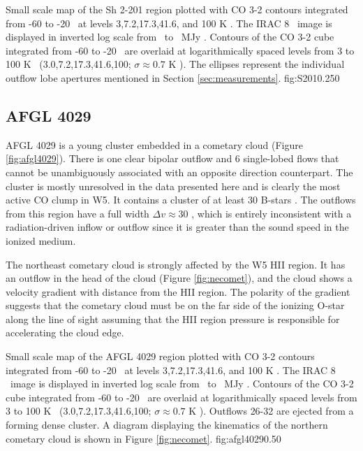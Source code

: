 {Small scale map of the Sh 2-201 region plotted with CO 3-2 contours integrated
from -60 to -20 \kms\ at levels 3,7.2,17.3,41.6, and 100 K \kms.  
The IRAC 8 \um\ image is displayed in inverted log scale from \lowirac\
to \highirac\ MJy \persr. Contours of the CO 3-2 cube integrated from
-60 to -20 \kms\ are overlaid at logarithmically spaced levels from 3 to 100 K
\kms\ (3.0,7.2,17.3,41.6,100; $\sigma\approx0.7$ K \kms).  The
ellipses represent the individual outflow lobe apertures mentioned in Section
\ref{sec:measurements}.
}{fig:S201}{0.25}{0}

\subsection{AFGL 4029}
\label{sec:afgl4029}
AFGL 4029 is a young cluster embedded in a cometary cloud (Figure
\ref{fig:afgl4029}).  There is one clear bipolar outflow and 6 single-lobed
flows that cannot be unambiguously associated with an opposite direction
counterpart.  The cluster is mostly unresolved in the data presented here and
is clearly the most active CO clump in W5.  It contains a cluster of at least 30 B-stars
\citep{Deharveng1997}.  The outflows from this region have a full width $\Delta
v \approx 30$ \kms, which is entirely inconsistent with a radiation-driven
inflow or outflow since it is greater than the sound speed in the ionized
medium.

The northeast cometary cloud is strongly affected by
the W5 HII region.  It has an outflow in the head of the cloud (Figure
\ref{fig:necomet}), and the cloud shows a velocity gradient with distance from
the HII region.  The polarity of the gradient suggests that the cometary cloud
must be on the far side of the ionizing O-star along the line of sight assuming
that the HII region pressure is responsible for accelerating the cloud edge.

{Small scale map of the AFGL 4029 region plotted with CO 3-2 contours integrated
from -60 to -20 \kms\ at levels 3,7.2,17.3,41.6, and 100 K \kms.  
The IRAC 8 \um\ image is displayed in inverted log scale from \lowirac\ to
\highirac\ MJy \persr. Contours of the CO 3-2 cube integrated from -60 to -20
\kms\ are overlaid at logarithmically spaced levels from 3 to 100 K \kms\
(3.0,7.2,17.3,41.6,100; $\sigma\approx0.7$ K \kms).  Outflows 26-32 are ejected
from a forming dense cluster.  A diagram displaying the kinematics of the
northern cometary cloud is shown in Figure \ref{fig:necomet}. }
{fig:afgl4029}{0.5}{0}


